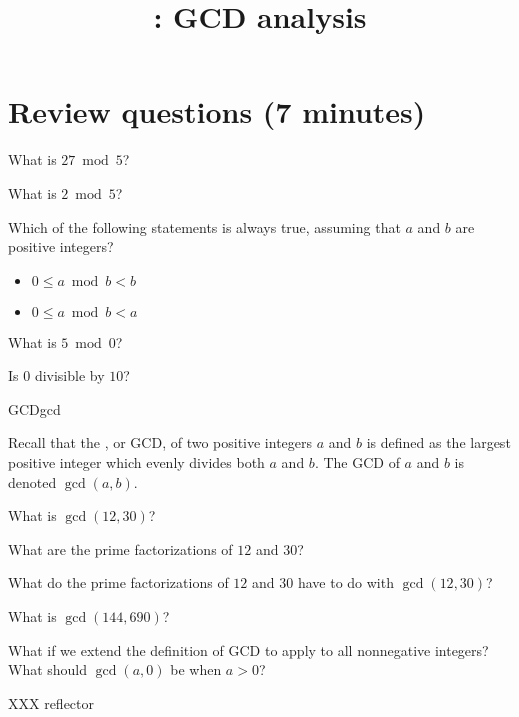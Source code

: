 \documentclass{tufte-handout}
\title{\thecourse: GCD analysis}
\date{}
\begin{document}
\maketitle

\section{Review questions (7 minutes)}

\begin{questions}
  \item What is $27 \bmod 5$?
  \item What is $2 \bmod 5$?
  \item Which of the following statements is always true, assuming that $a$
    and $b$ are positive integers?
    \begin{itemize}
    \item $0 \leq a \bmod b < b$
    \item $0 \leq a \bmod b < a$
    \end{itemize}
  \item What is $5 \bmod 0$?
  \item Is $0$ divisible by $10$?
\end{questions}

\newpage
\begin{model*}{GCD}{gcd}
\begin{defn}
  Recall that the , or GCD, of two
  positive integers $a$ and $b$ is defined as the largest positive
  integer which evenly divides both $a$ and $b$.  The GCD of $a$ and
  $b$ is denoted $\gcd(a,b)$.
\end{defn}
\end{model*}

\begin{questions}
\item What is $\gcd(12,30)$?
\item What are the prime factorizations of $12$ and $30$?
\item What do the prime factorizations of $12$ and $30$ have to do
  with $\gcd(12,30)$?
\item What is $\gcd(144, 690)$?
\item What if we extend the definition of GCD to apply to all
  nonnegative integers?  What should $\gcd(a,0)$ be when $a > 0$?
\item XXX reflector
\end{questions}

\newpage
\end{document}
